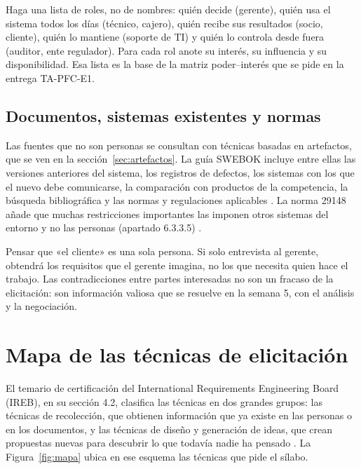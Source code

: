 \documentclass[11pt,a4paper,oneside]{report}
\begin{document}
\begin{enlapractica}
	Haga una lista de roles, no de nombres: quién decide (gerente), quién usa el sistema todos los días (técnico, cajero), quién recibe sus resultados (socio, cliente), quién lo mantiene (soporte de TI) y quién lo controla desde fuera (auditor, ente regulador). Para cada rol anote su interés, su influencia y su disponibilidad. Esa lista es la base de la matriz poder--interés que se pide en la entrega TA-PFC-E1.
\end{enlapractica}

\subsection{Documentos, sistemas existentes y normas}

Las fuentes que no son personas se consultan con técnicas basadas en artefactos, que se ven en la sección~\ref{sec:artefactos}. La guía SWEBOK incluye entre ellas las versiones anteriores del sistema, los registros de defectos, los sistemas con los que el nuevo debe comunicarse, la comparación con productos de la competencia, la búsqueda bibliográfica y las normas y regulaciones aplicables \citep{swebok_v4_2024}. La norma 29148 añade que muchas restricciones importantes las imponen otros sistemas del entorno y no las personas (apartado 6.3.3.5) \citep{iso29148_2018}.

\begin{cuidado}
	Pensar que «el cliente» es una sola persona. Si solo entrevista al gerente, obtendrá los requisitos que el gerente imagina, no los que necesita quien hace el trabajo. Las contradicciones entre partes interesadas no son un fracaso de la elicitación: son información valiosa que se resuelve en la semana 5, con el análisis y la negociación.
\end{cuidado}

\section{Mapa de las técnicas de elicitación}

El temario de certificación del International Requirements Engineering Board (IREB), en su sección 4.2, clasifica las técnicas en dos grandes grupos: las técnicas de recolección, que obtienen información que ya existe en las personas o en los documentos, y las técnicas de diseño y generación de ideas, que crean propuestas nuevas para descubrir lo que todavía nadie ha pensado \citep{ireb_cpre_fl_2026}. La Figura~\ref{fig:mapa} ubica en ese esquema las técnicas que pide el sílabo.
\end{document}
